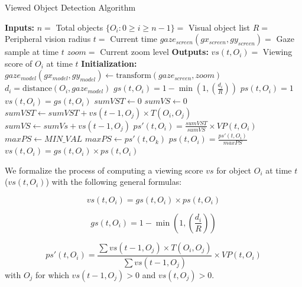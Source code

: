 \begin{algorithm}
\caption{Viewed Object Detection Algorithm}
\label{alg:ObjectDetection}
\begin{algorithmic}[1]
\State \textbf{Inputs: } 
\Statex $n = $ Total objects
\Statex $\{O_i: 0 \geq i \geq n-1\} = $ Visual object list 
\Statex $R = $ Peripheral vision radius
\Statex $ t = $ Current time
\Statex $gaze_{screen}(gx_{screen}, gy_{screen}) = $ Gaze sample at time $t$
\Statex $zoom = $ Current zoom level
\State \textbf{Outputs:}
\Statex $vs(t, O_i) = $ Viewing score of $O_i$ at time $t$
\State \textbf{Initialization: }
\Statex $gaze_{model}(gx_{model}, gy_{model}) \gets \text{transform}(gaze_{screen}, zoom)$
\Statex
{}
	\State $d_i = \text{distance}(O_i, gaze_{model})$
	\State $gs(t, O_i) = 1 - \min{(1, (\frac{d_i}{R}))}$
		\State $ps(t, O_i) = 1$
		\State $vs(t, O_i) = gs(t,O_i)$
	\Else
		\State $sumVST \gets 0$
		\State $sumVS \gets 0$
				\State $sumVST \gets sumVST + vs(t-1, O_j) \times T(O_i,O_j)$
				\State $sumVS \gets sumVs + vs(t-1, O_j)$				
			\EndIf
		\EndFor
		\State $ps'(t, O_i) = \frac{sumVST}{sumVS} \times VP(t, O_i)$
		\State $maxPS \gets MIN\_VAL$
				\State $maxPS \gets ps'(t,O_k)$
			\EndIf
		\EndFor
		\State $ps(t,O_i) = \frac{ps'(t, O_i)}{maxPS}$
		\State $vs(t, O_i) = gs(t, O_i) \times ps(t, O_i)$
	\EndIf
\EndFor
\end{algorithmic}
\end{algorithm}

We formalize the process of computing a viewing score $vs$ for object $O_i$ at time $t$  ($vs(t,O_i)$) with the following general formulas:


\begin{equation}
vs(t, O_i) = gs(t, O_i) \times ps(t, O_i)
\label{eq:VS}
\end{equation}

\begin{equation}
gs(t, O_i) = 1 - \min{(1, (\frac{d_i}{R}))}
\label{eq:GS}
\end{equation}

\begin{equation}
ps'(t, O_i) = \frac{\sum{vs(t-1, O_j)} \times T(O_i,O_j)}{\sum{vs(t-1, O_j)}} \times VP(t, O_i)
\label{eq:PSDash}
\end{equation}
with $O_j$ for which $vs(t-1, O_j) > 0$ and $vs(t, O_j) > 0$.

